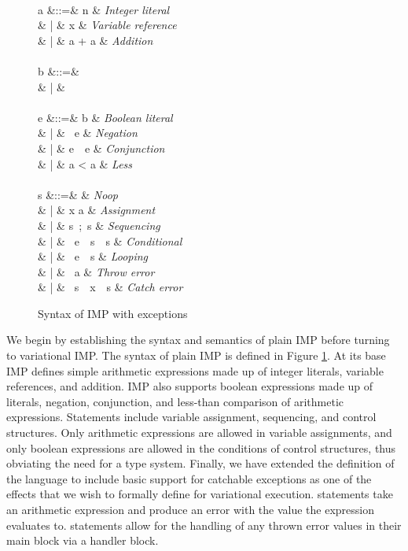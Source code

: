 \documentclass[onehalf,11pt]{beavtex}
\begin{document}
\begin{figure}
\begin{syntax}
\\
a &::=& n & \textit{Integer literal} \\
& | & x & \textit{Variable reference} \\
& | & a + a & \textit{Addition} \\
 \\
b &::=&  \\
& | &  \\
 \\
e &::=& b & \textit{Boolean literal} \\
& | & \ e & \textit{Negation} \\
& | & e\ \ e & \textit{Conjunction} \\
& | & a < a & \textit{Less} \\
 \\
s &::=&  & \textit{Noop} \\
& | & x \coloneqq a & \textit{Assignment} \\
& | & s\ ;\ s & \textit{Sequencing} \\
& | & \ e\ \ s\ \ s & \textit{Conditional} \\
& | & \ e\ \ s & \textit{Looping} \\
& | & \ a & \textit{Throw error} \\
& | & \ s\ \ x\ \ s & \textit{Catch error}
\end{syntax}
\caption{Syntax of IMP with exceptions}
\label{fig:impsyn}
\end{figure}

We begin by establishing the syntax and semantics of plain IMP before turning to variational IMP. The syntax of plain IMP is defined in Figure \ref{fig:impsyn}.
At its base IMP defines simple arithmetic expressions made up of integer literals, variable references, and addition. IMP also supports boolean expressions
made up of literals, negation, conjunction, and less-than comparison of arithmetic expressions. Statements include variable assignment, sequencing, and
control structures. Only arithmetic expressions are allowed in variable assignments, and only boolean expressions are allowed in the conditions of control
structures, thus obviating the need for a type system. Finally, we have extended the definition of the language to include basic support for catchable exceptions
as one of the effects that we wish to formally define for variational execution.  statements take an arithmetic expression and produce an
error with the value the expression evaluates to.  statements allow for the handling of any thrown error values in their main block via a
handler block.
\end{document}
